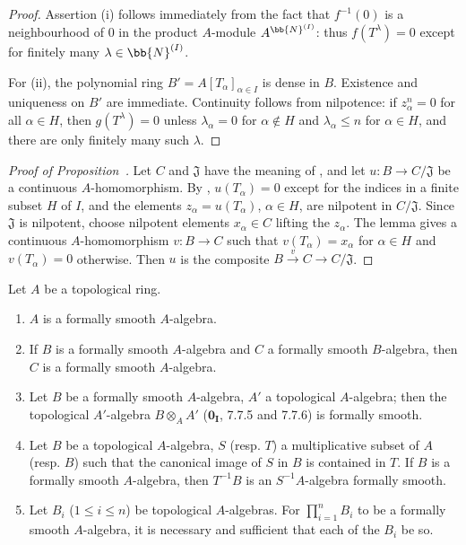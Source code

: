 
\begin{proof}
Assertion (i) follows immediately from the fact that $f^{-1}(0)$ is a neighbourhood of $0$ in the product $A$-module $A^{\bb{N}^{(I)}}$: thus $f(T^\lambda)=0$ except for finitely many $\lambda\in\bb{N}^{(I)}$.

For (ii), the polynomial ring $B'=A[T_\alpha]_{\alpha\in I}$ is dense in $B$.
Existence and uniqueness on $B'$ are immediate.
Continuity follows from nilpotence: if $z_\alpha^n=0$ for all $\alpha\in H$, then $g(T^\lambda)=0$ unless $\lambda_\alpha=0$ for $\alpha\notin H$ and $\lambda_\alpha\leq n$ for $\alpha\in H$, and there are only finitely many such $\lambda$.
\end{proof}

\begin{proof}[Proof of Proposition~{\rm{}}]
Let $C$ and $\mathfrak{J}$ have the meaning of , and let $u:B\to C/\mathfrak{J}$ be a continuous $A$-homomorphism.
By , $u(T_\alpha)=0$ except for the indices in a finite subset $H$ of $I$, and the elements $z_\alpha=u(T_\alpha)$, $\alpha\in H$, are nilpotent in $C/\mathfrak{J}$.
Since $\mathfrak{J}$ is nilpotent, choose nilpotent elements $x_\alpha\in C$ lifting the $z_\alpha$.
The lemma gives a continuous $A$-homomorphism $v:B\to C$ such that $v(T_\alpha)=x_\alpha$ for $\alpha\in H$ and $v(T_\alpha)=0$ otherwise.
Then $u$ is the composite $B\xrightarrow{v}C\to C/\mathfrak{J}$.
\end{proof}

\begin{proposition}[19.3.5]
\label{0.19.3.5}
Let $A$ be a topological ring.
\begin{enumerate}
  \item[(i)] $A$ is a formally smooth $A$-algebra.
  \item[(ii)] If $B$ is a formally smooth $A$-algebra and $C$ a formally smooth $B$-algebra, then $C$ is a formally smooth $A$-algebra.
  \item[(iii)] Let $B$ be a formally smooth $A$-algebra, $A'$ a topological $A$-algebra;
  then the topological $A'$-algebra $B\otimes_A A'$ ($\mathbf{0_I}$, 7.7.5 and 7.7.6) is formally smooth.
  \item[(iv)] Let $B$ be a topological $A$-algebra, $S$ (resp. $T$) a multiplicative subset of $A$ (resp. $B$) such that the canonical image of $S$ in $B$ is contained in $T$.
  If $B$ is a formally smooth $A$-algebra, then $T^{-1}B$ is an $S^{-1}A$-algebra formally smooth.
  \item[(v)] Let $B_i$ ($1\leq i\leq n$) be topological $A$-algebras.
  For $\prod_{i=1}^n B_i$ to be a formally smooth $A$-algebra, it is necessary and sufficient that each of the $B_i$ be so.
\end{enumerate}
\end{proposition}

